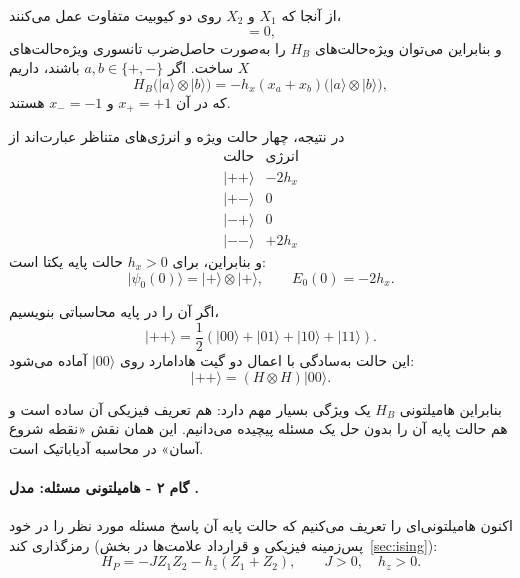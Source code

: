 از آنجا که $X_1$ و $X_2$ روی دو کیوبیت متفاوت عمل می‌کنند،
\begin{equation}
	[X_1,X_2]=0,
\end{equation}
و بنابراین می‌توان ویژه‌حالت‌های $H_B$ را به‌صورت حاصل‌ضرب تانسوری ویژه‌حالت‌های $X$ ساخت. اگر
$a,b\in\{+,-\}$ باشند، داریم
\begin{equation}
	H_B\bigl(\lvert a\rangle\otimes\lvert b\rangle\bigr)
	=
	-h_x(x_a+x_b)
	\bigl(\lvert a\rangle\otimes\lvert b\rangle\bigr),
\end{equation}
که در آن $x_+=+1$ و $x_-=-1$ هستند.

در نتیجه، چهار حالت ویژه و انرژی‌های متناظر عبارت‌اند از
\begin{equation}
	\begin{array}{c|c}
		\text{حالت} & \text{انرژی}\\
		\hline
		\lvert++\rangle & -2h_x\\
		\lvert+-\rangle & 0\\
		\lvert-+\rangle & 0\\
		\lvert--\rangle & +2h_x
	\end{array}
\end{equation}
و بنابراین، برای $h_x>0$ حالت پایه یکتا است:
\begin{equation}
	\label{eq:initial-ground-state}
	\lvert\psi_0(0)\rangle
	=
	\lvert+\rangle\otimes\lvert+\rangle,
	\qquad
	E_0(0)=-2h_x.
\end{equation}

اگر آن را در پایه محاسباتی بنویسیم،
\begin{equation}
	\label{eq:plus-plus}
	\lvert++\rangle
	=
	\frac{1}{2}
	\left(
	\lvert00\rangle+
	\lvert01\rangle+
	\lvert10\rangle+
	\lvert11\rangle
	\right).
\end{equation}
این حالت به‌سادگی با اعمال دو گیت هادامارد روی $\lvert00\rangle$ آماده می‌شود:
\begin{equation}
	\lvert++\rangle
	=
	(H\otimes H)\lvert00\rangle.
\end{equation}

بنابراین هامیلتونی $H_B$ یک ویژگی بسیار مهم دارد: هم تعریف فیزیکی آن ساده است و هم حالت پایه آن را بدون حل یک مسئله پیچیده می‌دانیم. این همان نقش «نقطه شروع آسان» در محاسبه آدیاباتیک است.

\paragraph{گام ۲ - هامیلتونی مسئله: مدل .}

اکنون هامیلتونی‌ای را تعریف می‌کنیم که حالت پایه آن پاسخ مسئله مورد نظر را در خود رمزگذاری کند (پس‌زمینه فیزیکی و قرارداد علامت‌ها در بخش~\ref{sec:ising}):
\begin{equation}
	\label{eq:HP}
	H_P
	=
	-JZ_1Z_2-h_z(Z_1+Z_2),
	\qquad
	J>0,\quad h_z>0.
\end{equation}

